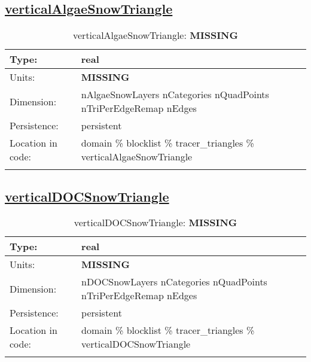 \subsection[verticalAlgaeSnowTriangle]{\hyperref[sec:var_tab_tracer_triangles]{verticalAlgaeSnowTriangle}}
\label{subsec:var_sec_tracer_triangles_verticalAlgaeSnowTriangle}
\begin{center}
\begin{longtable}{| p{2.0in} | p{4.0in} |}
        \hline 
        Type: & real \\
        \hline 
        Units: & {\bf \color{red} MISSING} \\
        \hline 
        Dimension: & nAlgaeSnowLayers nCategories nQuadPoints nTriPerEdgeRemap nEdges \\
        \hline 
        Persistence: & persistent \\
        \hline 
         Location in code: & domain \% blocklist \% tracer\_triangles \% verticalAlgaeSnowTriangle \\
         \hline 
    \caption{verticalAlgaeSnowTriangle: {\bf \color{red} MISSING}}
\end{longtable}
\end{center}
\subsection[verticalDOCSnowTriangle]{\hyperref[sec:var_tab_tracer_triangles]{verticalDOCSnowTriangle}}
\label{subsec:var_sec_tracer_triangles_verticalDOCSnowTriangle}
\begin{center}
\begin{longtable}{| p{2.0in} | p{4.0in} |}
        \hline 
        Type: & real \\
        \hline 
        Units: & {\bf \color{red} MISSING} \\
        \hline 
        Dimension: & nDOCSnowLayers nCategories nQuadPoints nTriPerEdgeRemap nEdges \\
        \hline 
        Persistence: & persistent \\
        \hline 
         Location in code: & domain \% blocklist \% tracer\_triangles \% verticalDOCSnowTriangle \\
         \hline 
    \caption{verticalDOCSnowTriangle: {\bf \color{red} MISSING}}
\end{longtable}
\end{center}
